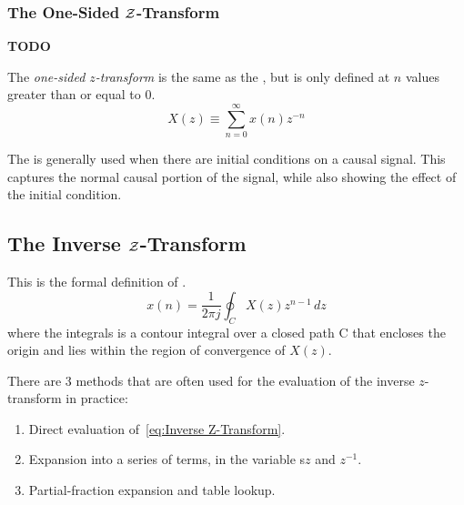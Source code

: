 \subsubsection{The One-Sided \texorpdfstring{$\operatorname{\mathcal{Z}}$-Transform}{Z-Transform}}\label{subsubsec:One-Sided Z-Transform}
\textbf{TODO}
\begin{definition}\label{def:One-Sided Z-Transform}
  The \emph{one-sided $z$-transform} is the same as the , but is only defined at $n$ values greater than or equal to 0.
  \begin{equation}\label{eq:One-Sided Z-Transform}
    X(z) \equiv \sum_{n=0}^{\infty} x(n)z^{-n}
  \end{equation}
\end{definition}

The  is generally used when there are initial conditions on a causal signal.
This captures the normal causal portion of the signal, while also showing the effect of the initial condition.

\subsection{The Inverse \texorpdfstring{$\operatorname{\mathcal{Z}}$-Transform}{Z-Transform}}\label{subsec:Inverse Z-Transform}
This is the formal definition of .
\begin{equation}\label{eq:Inverse Z-Transform}
  x(n) = \frac{1}{2 \pi j} \oint_{C} X(z) z^{n-1} \, dz
\end{equation}
where the integrals is a contour integral over a closed path C that encloses the origin and lies within the region of convergence of $X(z)$.

There are 3 methods that are often used for the evaluation of the inverse $z$-transform in practice:
\begin{enumerate}[noitemsep]
\item Direct evaluation of~\eqref{eq:Inverse Z-Transform}.
\item Expansion into a series of terms, in the variable s$z$ and $z^{-1}$.
\item Partial-fraction expansion and table lookup.
\end{enumerate}

